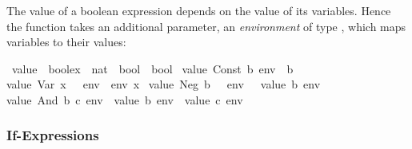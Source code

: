 \begin{isabellebody}
\begin{isamarkuptext}
The value of a boolean expression depends on the value of its variables.
Hence the function  takes an additional parameter, an
\emph{environment} of type , which maps variables to their
values:%
\end{isamarkuptext}%
\isamarkuptrue%
\isamarkupfalse%
\ {}value{}\ {}{}\ {}boolex\ {}\ {}nat\ {}\ bool{}\ {}\ bool{}\ \isanewline
{}value\ {}Const\ b{}\ env\ {}\ b{}\ {}\isanewline
{}value\ {}Var\ x{}\ \ \ env\ {}\ env\ x{}\ {}\isanewline
{}value\ {}Neg\ b{}\ \ \ env\ {}\ {}{}\ value\ b\ env{}{}\ {}\isanewline
{}value\ {}And\ b\ c{}\ env\ {}\ {}value\ b\ env\ {}\ value\ c\ env{}{}%
\begin{isamarkuptext}%
\noindent
\subsubsection{If-Expressions}


\end{isamarkuptext}
\end{isabellebody}
